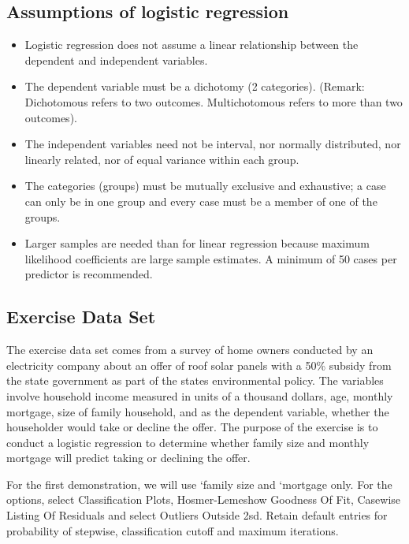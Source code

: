 \documentclass[a4paper,12pt]{article}
\begin{document}
\subsection{Assumptions of logistic regression}
\begin{itemize}
\item Logistic regression does not assume a linear relationship between the dependent and
independent variables.
\item The dependent variable must be a dichotomy (2 categories).
(Remark: Dichotomous refers to two outcomes. Multichotomous refers to more than two outcomes).
\item The independent variables need not be interval, nor normally distributed, nor linearly
related, nor of equal variance within each group.
\item The categories (groups) must be mutually exclusive and exhaustive; a case can only be
in one group and every case must be a member of one of the groups.
\item Larger samples are needed than for linear regression because maximum likelihood
coefficients are large sample estimates. A minimum of 50 cases per predictor is
recommended.
\end{itemize}
\subsection{Exercise Data Set}
The exercise data set comes from a survey of home owners
conducted by an electricity company about an offer of roof solar panels with a 50\% subsidy
from the state government as part of the states environmental policy. The variables involve
household income measured in units of a thousand dollars, age, monthly mortgage, size of
family household, and as the dependent variable, whether the householder would take or decline the offer.
The purpose of the exercise is to conduct a logistic regression to determine whether family
size and monthly mortgage will predict taking or declining the offer.

For the first demonstration, we will use `family size and
`mortgage only. For the options, select Classification Plots, Hosmer-Lemeshow Goodness
Of Fit, Casewise Listing Of Residuals and select Outliers Outside 2sd. Retain default
entries for probability of stepwise, classification cutoff and maximum iterations.
\end{document}
